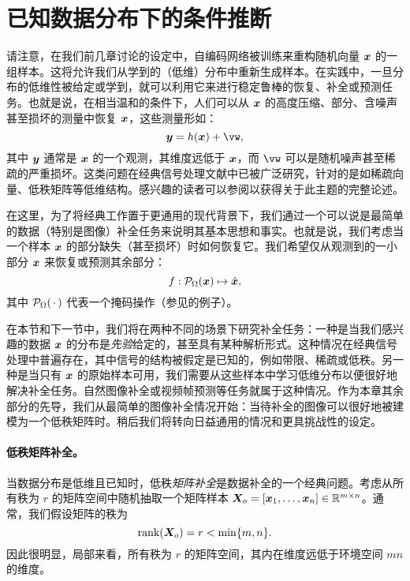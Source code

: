 \documentclass[../../book-main_zh.tex]{subfiles}
\begin{document}


\section{已知数据分布下的条件推断}
请注意，在我们前几章讨论的设定中，自编码网络被训练来重构随机向量 $\bm{x}$ 的一组样本。这将允许我们从学到的（低维）分布中重新生成样本。在实践中，一旦分布的低维性被给定或学到，就可以利用它来进行稳定鲁棒的恢复、补全或预测任务。也就是说，在相当温和的条件下，人们可以从 $\bm{x}$ 的高度压缩、部分、含噪声甚至损坏的测量中恢复 $\bm{x}$，这些测量形如：
\begin{equation}
    \y = h(\x) + \vw,
\end{equation}
其中 $\bm{y}$ 通常是 $\bm{x}$ 的一个观测，其维度远低于 $\bm{x}$，而 $\vw$ 可以是随机噪声甚至稀疏的严重损坏。这类问题在经典信号处理文献中已被广泛研究，针对的是如稀疏向量、低秩矩阵等低维结构。感兴趣的读者可以参阅\cite{Wright-Ma-2022}以获得关于此主题的完整论述。

在这里，为了将经典工作置于更通用的现代背景下，我们通过一个可以说是最简单的数据（特别是图像）补全任务来说明其基本思想和事实。也就是说，我们考虑当一个样本 $\bm{x}$ 的部分缺失（甚至损坏）时如何恢复它。我们希望仅从观测到的一小部分 $\bm{x}$ 来恢复或预测其余部分：
\begin{equation}
f: \mathcal{P}_{\Omega}(\bm{x}) \mapsto \hat{\bm{x}},
\end{equation}
其中 $\mathcal{P}_{\Omega}(\,\cdot\,)$ 代表一个掩码操作（参见的例子）。

在本节和下一节中，我们将在两种不同的场景下研究补全任务：一种是当我们感兴趣的数据 $\bm{x}$ 的分布是{\em 先验}给定的，甚至具有某种解析形式。这种情况在经典信号处理中普遍存在，其中信号的结构被假定是已知的，例如带限、稀疏或低秩。另一种是当只有 $\bm{x}$ 的原始样本可用，我们需要从这些样本中学习低维分布以便很好地解决补全任务。自然图像补全或视频帧预测等任务就属于这种情况。作为本章其余部分的先导，我们从最简单的图像补全情况开始：当待补全的图像可以很好地被建模为一个低秩矩阵时。稍后我们将转向日益通用的情况和更具挑战性的设定。

\paragraph{低秩矩阵补全。}  
当数据分布是低维且已知时，低秩{\em 矩阵补全}是数据补全的一个经典问题。考虑从所有秩为 $r$ 的矩阵空间中随机抽取一个矩阵样本 $\bm{X}_o = [\bm{x}_1, \ldots, \bm{x}_n] \in \mathbb{R}^{m\times n}$。通常，我们假设矩阵的秩为
\begin{equation}
\mbox{rank}(\bm{X}_o) = r < \min\{m, n\}.
\end{equation}
因此很明显，局部来看，所有秩为 $r$ 的矩阵空间，其内在维度远低于环境空间 $mn$ 的维度。
\end{document}
